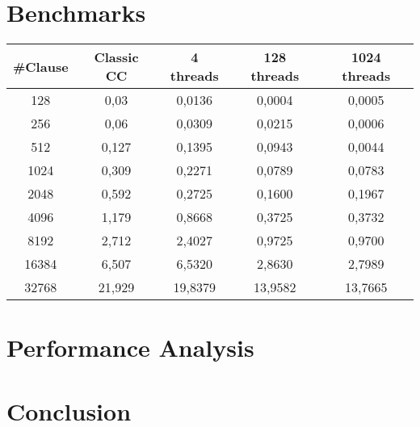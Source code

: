 \documentclass{IEEEtran}
\begin{document}
\section{Benchmarks}
\begin{center}
\begin{table}[htbp]
	\begin{tabular}{@{}c|cccc@{}}
		\toprule
		\textbf{\#Clause} & \textbf{Classic CC} & \textbf{4 threads} & \textbf{128 threads} & \textbf{1024 threads} \\ \midrule
		128               & 0,03                & 0,0136             & 0,0004               & 0,0005                \\
		256               & 0,06                & 0,0309             & 0,0215               & 0,0006                \\
		512               & 0,127               & 0,1395             & 0,0943               & 0,0044                \\
		1024              & 0,309               & 0,2271             & 0,0789               & 0,0783                \\
		2048              & 0,592               & 0,2725             & 0,1600               & 0,1967                \\
		4096              & 1,179               & 0,8668             & 0,3725               & 0,3732                \\
		8192              & 2,712               & 2,4027             & 0,9725               & 0,9700                \\
		16384             & 6,507               & 6,5320             & 2,8630               & 2,7989                \\
		32768             & 21,929              & 19,8379            & 13,9582              & 13,7665               \\ \bottomrule
	\end{tabular}
\end{table}

\end{center}

\section{Performance Analysis}


\section{Conclusion}
\end{document}
